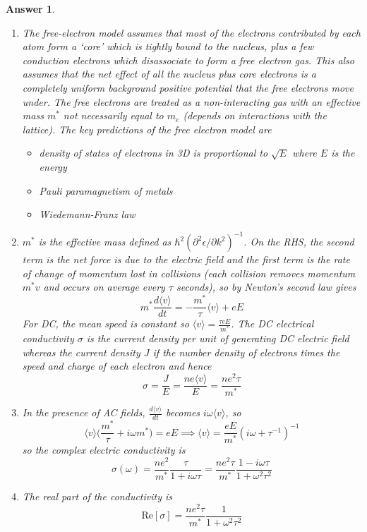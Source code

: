 \documentclass[a4paper]{article}
\newtheorem{ans}{Answer}[subsection]
\theoremstyle{new}
\begin{document}
\begin{ans}\leavevmode
\begin{enumerate}[label=(\roman*)]
\item The free-electron model assumes that most of the electrons contributed by each atom form a `core' which is tightly bound to the nucleus, plus a few conduction electrons which disassociate to form a free electron gas. This also assumes that the net effect of all the nucleus plus core electrons is a completely uniform background positive potential that the free electrons move under. The free electrons are treated as a non-interacting gas with an effective mass $m^*$ not necessarily equal to $m_e$ (depends on interactions with the lattice). The key predictions of the free electron model are
\begin{itemize}
    \item density of states of electrons in 3D is proportional to $\sqrt{E}$ where $E$ is the energy
    \item Pauli paramagnetism of metals
    \item Wiedemann-Franz law
\end{itemize}
\item $m^*$ is the effective mass defined as $\hbar^2(\partial^2\epsilon/\partial k^2)^{-1}$. On the RHS, the second term is the net force is due to the electric field and the first term is the rate of change of momentum lost in collisions (each collision removes momentum $m^*v$ and occurs on average every $\tau$ seconds), so by Newton's second law gives
$$m^*\frac{d\langle v\rangle}{dt}=-\frac{m^*}{\tau}\langle v\rangle+eE$$
For DC, the mean speed is constant so $\langle v\rangle=\frac{\tau eE}{m^*}$. The DC electrical conductivity $\sigma$ is the current density per unit of generating DC electric field whereas the current density $J$ if the number density of electrons times the speed and charge of each electron and hence
$$\sigma=\frac{J}{E}=\frac{ne\langle v\rangle}{E}=\frac{ne^2\tau}{m^*}$$
\item In the presence of AC fields, $\frac{d\langle v\rangle}{dt}$ becomes $i\omega\langle v\rangle$, so
$$\langle v\rangle\bigg(\frac{m^*}{\tau}+i\omega m^*\bigg)=eE\implies\langle v\rangle=\frac{eE}{m^*}(i\omega+\tau^{-1})^{-1}$$
so the complex electric conductivity is
$$\sigma(\omega)=\frac{ne^2}{m^*}\frac{\tau}{1+i\omega\tau}=\frac{ne^2\tau}{m^*}\frac{1-i\omega\tau}{1+\omega^2\tau^2}$$
\item The real part of the conductivity is
$$\text{Re}[\sigma]=\frac{ne^2\tau}{m^*}\frac{1}{1+\omega^2\tau^2}$$

\end{enumerate}
\end{ans}
\end{document}
